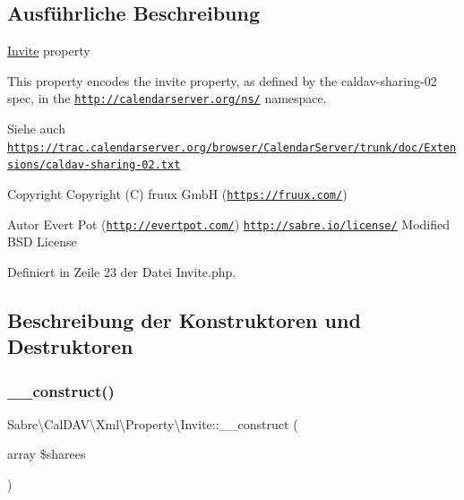 \subsection{Ausführliche Beschreibung}
\mbox{\hyperlink{class_sabre_1_1_cal_d_a_v_1_1_xml_1_1_property_1_1_invite}{Invite}} property

This property encodes the \textquotesingle{}invite\textquotesingle{} property, as defined by the \textquotesingle{}caldav-\/sharing-\/02\textquotesingle{} spec, in the \href{http://calendarserver.org/ns/}{\tt http\+://calendarserver.\+org/ns/} namespace.

\begin{DoxySeeAlso}{Siehe auch}
\href{https://trac.calendarserver.org/browser/CalendarServer/trunk/doc/Extensions/caldav-sharing-02.txt}{\tt https\+://trac.\+calendarserver.\+org/browser/\+Calendar\+Server/trunk/doc/\+Extensions/caldav-\/sharing-\/02.\+txt} 
\end{DoxySeeAlso}
\begin{DoxyCopyright}{Copyright}
Copyright (C) fruux GmbH (\href{https://fruux.com/}{\tt https\+://fruux.\+com/}) 
\end{DoxyCopyright}
\begin{DoxyAuthor}{Autor}
Evert Pot (\href{http://evertpot.com/}{\tt http\+://evertpot.\+com/})  \href{http://sabre.io/license/}{\tt http\+://sabre.\+io/license/} Modified B\+SD License 
\end{DoxyAuthor}


Definiert in Zeile 23 der Datei Invite.\+php.



\subsection{Beschreibung der Konstruktoren und Destruktoren}
\mbox{\label{class_sabre_1_1_cal_d_a_v_1_1_xml_1_1_property_1_1_invite_ae13c36e59aa45e9099c80103974940fb}} 
\subsubsection{\texorpdfstring{\+\_\+\+\_\+construct()}{\_\_construct()}}
{\footnotesize\ttfamily Sabre\textbackslash{}\+Cal\+D\+A\+V\textbackslash{}\+Xml\textbackslash{}\+Property\textbackslash{}\+Invite\+::\+\_\+\+\_\+construct (\begin{DoxyParamCaption}\item[{array}]{\$sharees }\end{DoxyParamCaption})}

